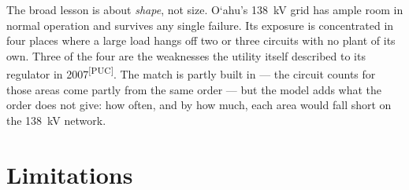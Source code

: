 \documentclass[11pt,a4paper]{article}
\newcommand{\okina}{\textquoteleft}
\newcommand{\Oahu}{O\okina ahu}
\newcommand{\src}[1]{\textsuperscript{[#1]}}
\begin{document}
The broad lesson is about \emph{shape}, not size. \Oahu's \SI{138}{kV} grid has
ample room in normal operation and survives any single failure. Its exposure is
concentrated in four places where a large load hangs off two or three circuits with no
plant of its own. Three of the four are the weaknesses the utility itself described to
its regulator in 2007\src{PUC}. The match is partly built in --- the circuit counts for
those areas come partly from the same order --- but the model adds what the order does
not give: how often, and by how much, each area would fall short on the \SI{138}{kV}
network.

\section{Limitations}
\label{sec:limits}
\end{document}
